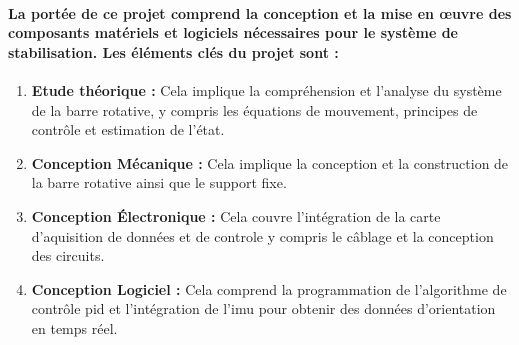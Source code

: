 \paragraph{La portée de ce projet comprend la conception et la mise en œuvre des composants matériels et logiciels nécessaires pour le système de stabilisation. Les éléments clés du projet sont :}

\begin{enumerate}
	\item \textbf{Etude théorique :} Cela implique la compréhension et l'analyse du système de la barre rotative, y compris les équations de mouvement, principes de contrôle et estimation de l'état.
	\item \textbf{Conception Mécanique :} Cela implique la conception et la construction de la barre rotative ainsi que le support fixe.
	\item \textbf{Conception Électronique :}  Cela couvre l'intégration de la carte d'aquisition de données et de controle y compris le câblage et la conception des circuits.
	\item \textbf{Conception Logiciel :} Cela comprend la programmation de l'algorithme de contrôle \acrshort{pid} et l'intégration de l'\gls{imu} pour obtenir des données d'orientation en temps réel.
\end{enumerate}
